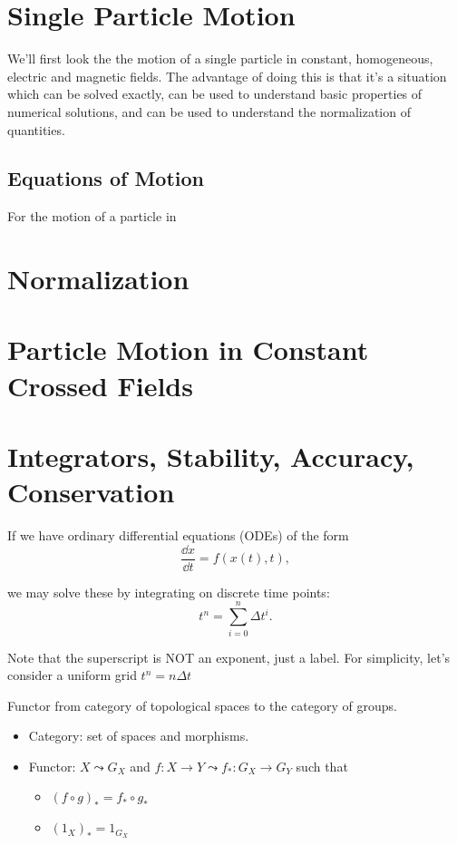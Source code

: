 \newpage
\section{Single Particle Motion}
We'll first look the the motion of a single particle in constant, homogeneous, electric and magnetic fields. The advantage of doing this is that it's a situation which can be solved exactly, can be used to understand basic properties of numerical solutions, and can be used to understand the normalization of quantities. 

\subsection{Equations of Motion}
For the motion of a particle in 
\section{Normalization}
\section{Particle Motion in Constant Crossed Fields}
\section{Integrators, Stability, Accuracy, Conservation}
If we have ordinary differential equations (ODEs) of the form
\begin{equation}
  \frac{\dd x}{\dd t} = f(x(t), t),
\end{equation}

we may solve these by integrating on discrete time points:
\begin{equation}
  t^n = \sum_{i = 0}^n \Delta t^i.
\end{equation}

Note that the superscript is NOT an exponent, just a label. For simplicity, let's consider a uniform grid $t^n = n\Delta t$

Functor from category of topological spaces to the category of groups.
\begin{itemize}
    \item Category: set of spaces and morphisms.
    \item Functor: $X \leadsto G_X$ and  $f:X\to Y \leadsto f_*: G_X \to  G_Y$ such that
        \begin{itemize}
            \item $(f \circ g)_* = f_* \circ g_* $
            \item $(1_X)_* = 1_{G_X}$
        \end{itemize}
\end{itemize}

